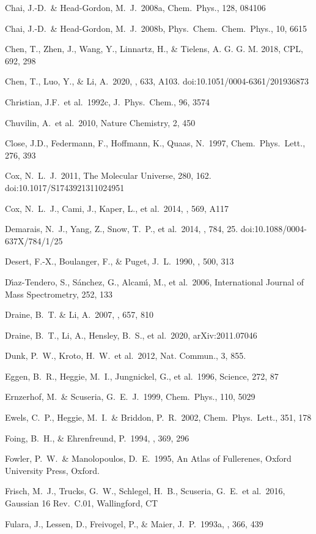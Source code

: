 \documentclass{aa}
\begin{document}
Chai, J.-D.\ \& Head-Gordon, M.~J.\ 2008a, Chem.\ Phys., 128, 084106

Chai, J.-D.\ \& Head-Gordon, M.~J.\ 2008b, Phys.\ Chem.\ Chem.\ Phys., 10, 6615

Chen, T., Zhen, J., Wang, Y., Linnartz, H., \& Tielens, A. G. G. M. 2018, 
CPL,
692, 298

Chen, T., Luo, Y., \& Li, A.\ 2020, \aap, 633, A103. doi:10.1051/0004-6361/201936873

Christian, J.F.\ et al.\ 1992c, J.\ Phys.\ Chem., 96, 3574

Chuvilin, A.\ et al.\ 2010, Nature Chemistry, 2, 450

Close, J.D., Federmann, F., Hoffmann, K., Quaas, N.\ 1997, Chem.\ Phys.\ Lett., 276, 393

Cox, N.~L.~J.\ 2011, The Molecular Universe, 280, 162. doi:10.1017/S1743921311024951

Cox, N.~L.~J., Cami, J., Kaper, L., et al.\ 2014, \aap, 569, A117

Demarais, N.~J., Yang, Z., Snow, T.~P., et al.\ 2014, \apj, 784, 25. doi:10.1088/0004-637X/784/1/25

Desert, F.-X., Boulanger, F., \& Puget, J.~L.\ 1990, \aap, 500, 313

D{\'\i}az-Tendero, S., S{\'a}nchez, G., Alcam{\'\i}, M., et al.\ 2006, International Journal of Mass Spectrometry, 252, 133

Draine, B.~T. \& Li, A.\ 2007, \apj, 657, 810

Draine, B.~T., Li, A., Hensley, B.~S., et al.\ 2020, arXiv:2011.07046

Dunk, P.~W., Kroto, H.~W.\ et al.\  2012, Nat. Commun., 3, 855.

Eggen, B.~R., Heggie, M.~I., Jungnickel, G., et al.\ 1996, Science, 272, 87

Ernzerhof, M.\ \& Scuseria, G.~E.~J.\ 1999, Chem.\ Phys., 110, 5029

Ewels, C.~P., Heggie, M.~I.\ \& Briddon, P.~R.\ 2002, Chem.\ Phys.\ Lett., 351, 178

Foing, B.~H., \& Ehrenfreund, P.\ 1994, \nat, 369, 296

Fowler, P.~W.\ \& Manolopoulos, D.~E.\ 1995, An Atlas of Fullerenes, Oxford University Press, Oxford. 

Frisch, M.~J., Trucks, G.~W., Schlegel, H.~B., Scuseria, G.~E.\ et al.\ 2016, Gaussian 16 Rev.\ C.01, Wallingford, CT

Fulara, J., Lessen, D.,  Freivogel, P., \& Maier, J.~P.\ 1993a, \nat, 366, 439 
\end{document}
